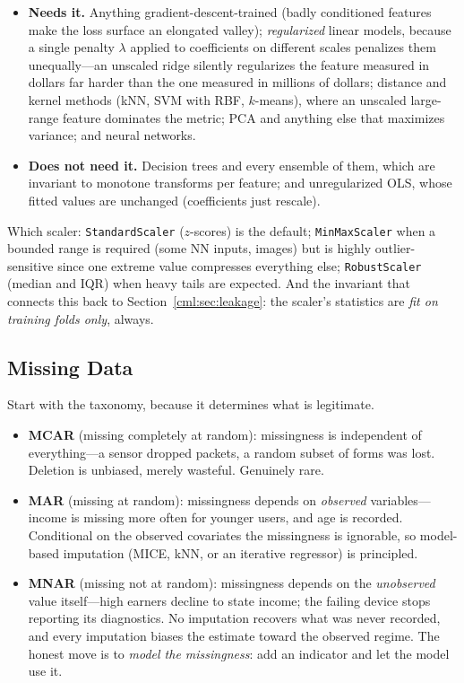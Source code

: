 \begin{itemize}
    \item \textbf{Needs it.} Anything gradient-descent-trained (badly conditioned features make the loss surface an elongated valley); \emph{regularized} linear models, because a single penalty $\lambda$ applied to coefficients on different scales penalizes them unequally---an unscaled ridge silently regularizes the feature measured in dollars far harder than the one measured in millions of dollars; distance and kernel methods (kNN, SVM with RBF, $k$-means), where an unscaled large-range feature dominates the metric; PCA and anything else that maximizes variance; and neural networks.
    \item \textbf{Does not need it.} Decision trees and every ensemble of them, which are invariant to monotone transforms per feature; and unregularized OLS, whose fitted values are unchanged (coefficients just rescale).
\end{itemize}

Which scaler: \texttt{StandardScaler} ($z$-scores) is the default; \texttt{MinMaxScaler} when a bounded range is required (some NN inputs, images) but is highly outlier-sensitive since one extreme value compresses everything else; \texttt{RobustScaler} (median and IQR) when heavy tails are expected. And the invariant that connects this back to Section~\ref{cml:sec:leakage}: the scaler's statistics are \emph{fit on training folds only}, always.

\subsection{Missing Data}

Start with the taxonomy, because it determines what is legitimate.

\begin{itemize}
    \item \textbf{MCAR} (missing completely at random): missingness is independent of everything---a sensor dropped packets, a random subset of forms was lost. Deletion is unbiased, merely wasteful. Genuinely rare.
    \item \textbf{MAR} (missing at random): missingness depends on \emph{observed} variables---income is missing more often for younger users, and age is recorded. Conditional on the observed covariates the missingness is ignorable, so model-based imputation (MICE, kNN, or an iterative regressor) is principled.
    \item \textbf{MNAR} (missing not at random): missingness depends on the \emph{unobserved} value itself---high earners decline to state income; the failing device stops reporting its diagnostics. No imputation recovers what was never recorded, and every imputation biases the estimate toward the observed regime. The honest move is to \emph{model the missingness}: add an indicator and let the model use it.
\end{itemize}

